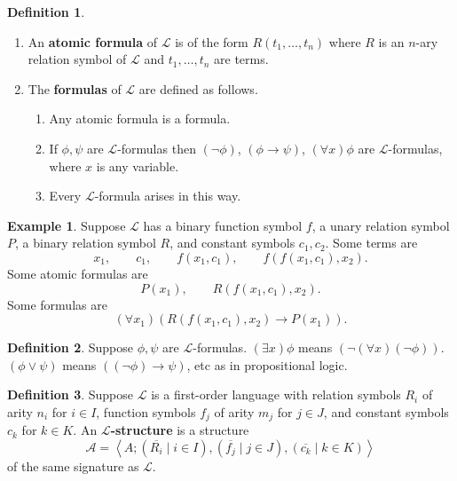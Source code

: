 \documentclass{article}
\newcommand{\rb}[1]{\left( #1 \right)}
\newcommand{\ab}[1]{\left\langle #1 \right\rangle}
\newcommand{\notb}[1]{\rb{\neg #1}}
\newcommand{\orb}[2]{\rb{#1 \lor #2}}
\newcommand{\impb}[2]{\rb{#1 \rightarrow #2}}
\newcommand{\fab}[1]{\rb{\forall #1}}
\newcommand{\teb}[1]{\rb{\exists #1}}
\theoremstyle{definition}\newtheorem{definition}{Definition}[subsection]
\theoremstyle{definition}\newtheorem{remark}[definition]{Remark}
\theoremstyle{definition}\newtheorem*{example}{Example}
\theoremstyle{definition}\newtheorem*{note}{Note}
\begin{document}
\begin{definition}
\hfill
\begin{enumerate}
\item An \textbf{atomic formula} of $ \mathcal{L} $ is of the form $ R\rb{t_1, \dots, t_n} $ where $ R $ is an $ n $-ary relation symbol of $ \mathcal{L} $ and $ t_1, \dots, t_n $ are terms.
\item The \textbf{formulas} of $ \mathcal{L} $ are defined as follows.
\begin{enumerate}
\item Any atomic formula is a formula.
\item If $ \phi, \psi $ are $ \mathcal{L} $-formulas then $ \notb{\phi} $, $ \impb{\phi}{\psi} $, $ \fab{x}\phi $ are $ \mathcal{L} $-formulas, where $ x $ is any variable.
\item Every $ \mathcal{L} $-formula arises in this way.
\end{enumerate}
\end{enumerate}
\end{definition}

\begin{example}
Suppose $ \mathcal{L} $ has a binary function symbol $ f $, a unary relation symbol $ P $, a binary relation symbol $ R $, and constant symbols $ c_1, c_2 $. Some terms are
$$ x_1, \qquad c_1, \qquad f\rb{x_1, c_1}, \qquad f\rb{f\rb{x_1, c_1}, x_2}. $$
Some atomic formulas are
$$ P\rb{x_1}, \qquad R\rb{f\rb{x_1, c_1}, x_2}. $$
Some formulas are
$$ \fab{x_1}\impb{R\rb{f\rb{x_1, c_1}, x_2}}{P\rb{x_1}}. $$
\end{example}

\begin{definition}
Suppose $ \phi, \psi $ are $ \mathcal{L} $-formulas. $ \teb{x}\phi $ means $ \notb{\fab{x}\notb{\phi}} $. $ \orb{\phi}{\psi} $ means $ \impb{\notb{\phi}}{\psi} $, etc as in propositional logic.
\end{definition}

\begin{definition}
Suppose $ \mathcal{L} $ is a first-order language with relation symbols $ R_i $ of arity $ n_i $ for $ i \in I $, function symbols $ f_j $ of arity $ m_j $ for $ j \in J $, and constant symbols $ c_k $ for $ k \in K $. An \textbf{$ \mathcal{L} $-structure} is a structure
$$ \mathcal{A} = \ab{A; \rb{\overline{R_i} \mid i \in I}, \rb{\overline{f_j} \mid j \in J}, \rb{\overline{c_k} \mid k \in K}} $$
of the same signature as $ \mathcal{L} $.
\end{definition}
\end{document}
